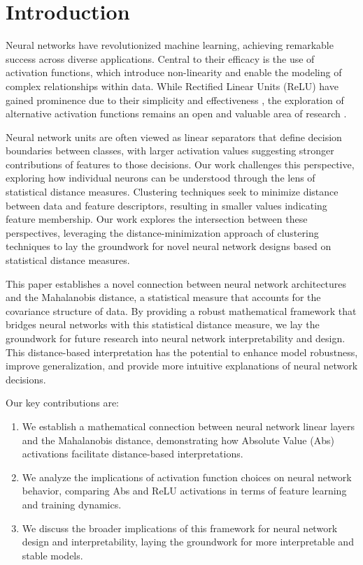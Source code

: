 \section{Introduction}

Neural networks have revolutionized machine learning, achieving remarkable success across diverse applications. Central to their efficacy is the use of activation functions, which introduce non-linearity and enable the modeling of complex relationships within data. While Rectified Linear Units (ReLU) have gained prominence due to their simplicity and effectiveness \citep{nair2010rectified}, the exploration of alternative activation functions remains an open and valuable area of research \citep{ramachandran2017searching}.

Neural network units are often viewed as linear separators that define decision boundaries between classes, with larger activation values suggesting stronger contributions of features to those decisions. Our work challenges this perspective, exploring how individual neurons can be understood through the lens of statistical distance measures. Clustering techniques seek to minimize distance between data and feature descriptors, resulting in smaller values indicating feature membership. Our work explores the intersection between these perspectives, leveraging the distance-minimization approach of clustering techniques to lay the groundwork for novel neural network designs based on statistical distance measures.

This paper establishes a novel connection between neural network architectures and the Mahalanobis distance, a statistical measure that accounts for the covariance structure of data. By providing a robust mathematical framework that bridges neural networks with this statistical distance measure, we lay the groundwork for future research into neural network interpretability and design. This distance-based interpretation has the potential to enhance model robustness, improve generalization, and provide more intuitive explanations of neural network decisions.

Our key contributions are:

\begin{enumerate}
    \item We establish a mathematical connection between neural network linear layers and the Mahalanobis distance, demonstrating how Absolute Value (Abs) activations facilitate distance-based interpretations.
    \item We analyze the implications of activation function choices on neural network behavior, comparing Abs and ReLU activations in terms of feature learning and training dynamics.
    \item We discuss the broader implications of this framework for neural network design and interpretability, laying the groundwork for more interpretable and stable models.
\end{enumerate}
